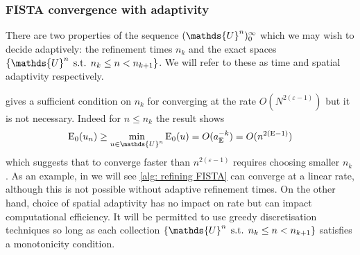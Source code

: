 \documentclass[10pt,a4paper,onecolumn]{article}
\numberwithin{equation}{section}
\let\F\mathds\let\C\mathcal\newcommand{\R}{\F{R}}\newcommand{\A}{\C{A}}
\newcommand{\op}[1]{\operatorname{#1}}\newcommand{\overtext}[2]{\stackrel{\text{#1}}{#2}}
\DeclareMathOperator{\st}{\;s.t.\;}\DeclareMathOperator{\as}{\;a.s.\;}\renewcommand{\epsilon}{\varepsilon}
\newcommand*{\Func}[1]{%
	\IfEqCase{#1}{%
		{0}{\op{E}}%
		{1}{\op{F}}%
		{2}{\op{G}}%
		{3}{\op{H}}%
	}[\op{F}#1]%
}
\newcommand*{\varf}[1]{%
	\IfEqCase{#1}{%
		{0}{u}%
		{1}{v}%
		{2}{w}%
	}[u#1]%
}
\newcommand*{\spcf}[1]{%
	\IfEqCase{#1}{%
		{0}{\F{U}}%
		{1}{\F{V}}%
		{2}{\F{W}}%
	}[\F{U}#1]%
}
\newcommand*{\vars}[1]{%
	\IfEqCase{#1}{%
		{0}{\alpha}%
		{1}{\beta}%
		{2}{\gamma}%
		{3}{a}%
		{4}{b}%
		{5}{c}%
	}[k#1]%
}
\begin{document}
\subsubsection{FISTA convergence with adaptivity}
There are two properties of the sequence $(\spcf0^n)_0^\infty$ which we may wish to decide adaptively: the refinement times $n_k$ and the exact spaces $\{\spcf0^n \st n_k\leq n<n_{k+1}\}$. We will refer to these as time and spatial adaptivity respectively.

 gives a sufficient condition on $n_k$ for converging at the rate $O(N^{2(\epsilon-1)})$ but it is not necessary. Indeed for $n\leq n_k$ the result shows 
$$\Func0_0(\varf0_n) \geq \min_{\varf0\in\spcf0^n}\Func0_0(\varf0) = O(\vars3_{\Func0}^{-k}) = O(n^{2(\epsilon-1)})$$
which suggests that to converge faster than $n^{2(\epsilon-1)}$ requires choosing smaller $n_k$. As an example, in  we will see \cref{alg: refining FISTA} can converge at a linear rate, although this is not possible without adaptive refinement times. On the other hand, choice of spatial adaptivity has no impact on rate but can impact computational efficiency. It will be permitted to use greedy discretisation techniques so long as each collection $\{\spcf0^n \st n_k\leq n<n_{k+1}\}$ satisfies a monotonicity condition.
\end{document}
